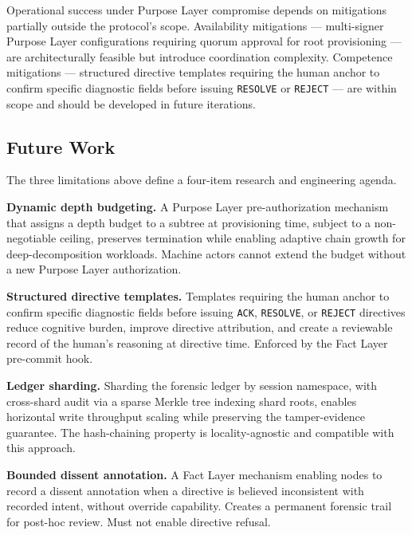 Operational success under Purpose Layer compromise depends on mitigations partially outside the protocol's scope. Availability mitigations — multi-signer Purpose Layer configurations requiring quorum approval for root provisioning — are architecturally feasible but introduce coordination complexity. Competence mitigations — structured directive templates requiring the human anchor to confirm specific diagnostic fields before issuing \texttt{RESOLVE} or \texttt{REJECT} — are within scope and should be developed in future iterations.

\subsection{Future Work}
\label{sec:rs-future-work}

The three limitations above define a four-item research and engineering agenda.

\textbf{Dynamic depth budgeting.} A Purpose Layer pre-authorization mechanism that assigns a depth budget to a subtree at provisioning time, subject to a non-negotiable ceiling, preserves termination while enabling adaptive chain growth for deep-decomposition workloads. Machine actors cannot extend the budget without a new Purpose Layer authorization.

\textbf{Structured directive templates.} Templates requiring the human anchor to confirm specific diagnostic fields before issuing \texttt{ACK}, \texttt{RESOLVE}, or \texttt{REJECT} directives reduce cognitive burden, improve directive attribution, and create a reviewable record of the human's reasoning at directive time. Enforced by the Fact Layer pre-commit hook.

\textbf{Ledger sharding.} Sharding the forensic ledger by session namespace, with cross-shard audit via a sparse Merkle tree indexing shard roots, enables horizontal write throughput scaling while preserving the tamper-evidence guarantee. The hash-chaining property is locality-agnostic and compatible with this approach.

\textbf{Bounded dissent annotation.} A Fact Layer mechanism enabling nodes to record a dissent annotation when a directive is believed inconsistent with recorded intent, without override capability. Creates a permanent forensic trail for post-hoc review. Must not enable directive refusal.

